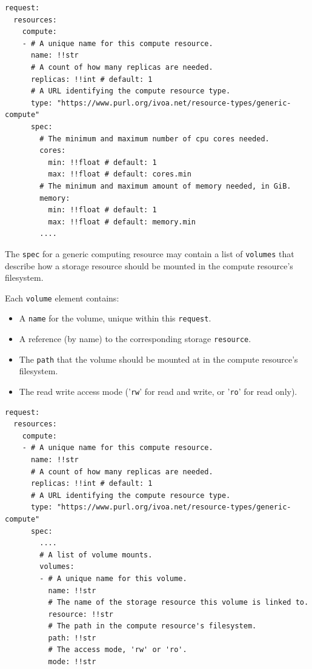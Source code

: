 \documentclass[11pt,a4paper]{ivoa}
\newcommand{\codeword}[1] {\texttt{#1}}
\begin{document}
\begin{lstlisting}[]
request:
  resources:
    compute:
    - # A unique name for this compute resource.
      name: !!str
      # A count of how many replicas are needed.
      replicas: !!int # default: 1
      # A URL identifying the compute resource type.
      type: "https://www.purl.org/ivoa.net/resource-types/generic-compute"
      spec:
        # The minimum and maximum number of cpu cores needed.
        cores:
          min: !!float # default: 1
          max: !!float # default: cores.min
        # The minimum and maximum amount of memory needed, in GiB.
        memory:
          min: !!float # default: 1
          max: !!float # default: memory.min
        ....
\end{lstlisting}

The \codeword{spec} for a generic computing resource may contain
a list of \codeword{volumes} that describe how a storage resource
should be mounted in the compute resource's filesystem.

\hfill \break
Each \codeword{volume} element contains:
\begin{itemize}
    \item A \codeword{name} for the volume, unique within this \codeword{request}.
    \item A reference (by name) to the corresponding storage \codeword{resource}.
    \item The \codeword{path} that the volume should be mounted at in the compute resource's filesystem.
    \item The read write access mode ('\codeword{rw}' for read and write, or '\codeword{ro}' for read only).
\end{itemize}

\begin{lstlisting}[]
request:
  resources:
    compute:
    - # A unique name for this compute resource.
      name: !!str
      # A count of how many replicas are needed.
      replicas: !!int # default: 1
      # A URL identifying the compute resource type.
      type: "https://www.purl.org/ivoa.net/resource-types/generic-compute"
      spec:
        ....
        # A list of volume mounts.
        volumes:
        - # A unique name for this volume.
          name: !!str
          # The name of the storage resource this volume is linked to.
          resource: !!str
          # The path in the compute resource's filesystem.
          path: !!str
          # The access mode, 'rw' or 'ro'.
          mode: !!str
\end{lstlisting}
\end{document}
